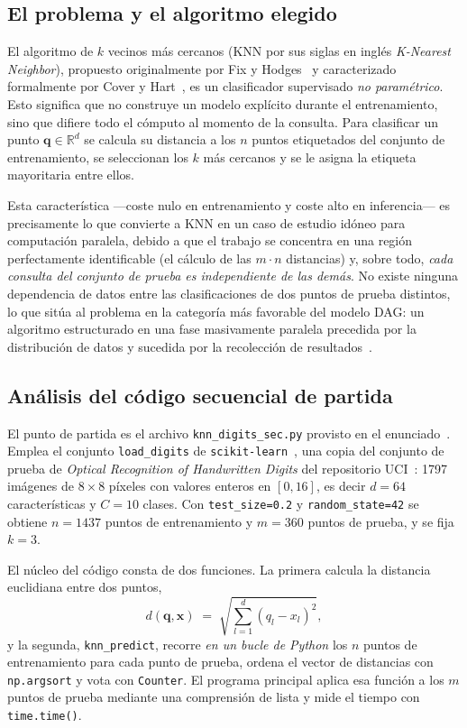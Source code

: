 \documentclass[11pt,a4paper]{article}
\begin{document}
\subsection{El problema y el algoritmo elegido}
El algoritmo de $k$ vecinos más cercanos (KNN por sus siglas en inglés \emph{K-Nearest Neighbor}),
propuesto originalmente por Fix y Hodges~\cite{fix1951} y caracterizado formalmente por Cover y
Hart~\cite{cover1967}, es un clasificador supervisado \emph{no paramétrico}. Esto significa que no
construye un modelo explícito durante el entrenamiento, sino que difiere todo el cómputo al momento
de la consulta. Para clasificar un punto $\mathbf{q}\in\mathbb{R}^d$ se calcula su distancia a los
$n$ puntos etiquetados del conjunto de entrenamiento, se seleccionan los $k$ más cercanos y se le
asigna la etiqueta mayoritaria entre ellos.

Esta característica ---coste nulo en entrenamiento y coste alto en inferencia--- es precisamente lo
que convierte a KNN en un caso de estudio idóneo para computación paralela, debido a que el trabajo
se concentra en una región perfectamente identificable (el cálculo de las $m\cdot n$ distancias) y,
sobre todo, \emph{cada consulta del conjunto de prueba es independiente de las demás}. No existe
ninguna dependencia de datos entre las clasificaciones de dos puntos de prueba distintos, lo que
sitúa al problema en la categoría más favorable del modelo DAG: un algoritmo estructurado en una
fase masivamente paralela precedida por la distribución de datos y sucedida por la recolección de
resultados~\cite{fiestasU1}.

\subsection{Análisis del código secuencial de partida}
El punto de partida es el archivo \texttt{knn\_digits\_sec.py} provisto en el
enunciado~\cite{fiestasProyecto}. Emplea el conjunto \texttt{load\_digits} de
\texttt{scikit-learn}~\cite{pedregosa2011}, una copia del conjunto de prueba de \emph{Optical
Recognition of Handwritten Digits} del repositorio UCI~\cite{alpaydin1998}: 1797 imágenes de
$8\times8$ píxeles con valores enteros en $[0,16]$, es decir $d=64$ características y $C=10$
clases. Con \texttt{test\_size=0.2} y \texttt{random\_state=42} se obtiene $n=1437$ puntos de
entrenamiento y $m=360$ puntos de prueba, y se fija $k=3$.

El núcleo del código consta de dos funciones. La primera calcula la distancia euclidiana entre dos
puntos,
\begin{equation}
  d(\mathbf{q},\mathbf{x}) \;=\; \sqrt{\sum_{l=1}^{d}(q_l-x_l)^2},\label{eq:dist}
\end{equation}
y la segunda, \texttt{knn\_predict}, recorre \emph{en un bucle de Python} los $n$ puntos de
entrenamiento para cada punto de prueba, ordena el vector de distancias con \texttt{np.argsort} y
vota con \texttt{Counter}. El programa principal aplica esa función a los $m$ puntos de prueba
mediante una comprensión de lista y mide el tiempo con \texttt{time.time()}.
\end{document}
